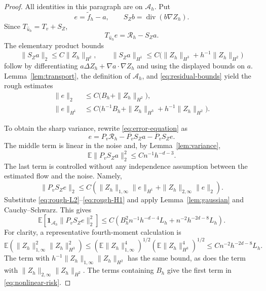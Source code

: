 \documentclass[11pt]{article}
\theoremstyle{remark}
\newcommand{\E}{\mathbb E}
\newcommand{\one}{\mathbf 1}
\DeclareMathOperator{\divergence}{div}
\begin{document}
\begin{proof}
All identities in this paragraph are on \(\mathcal A_h\).
Put
\[
e=\widetilde f_h-a,\qquad
S_Zb=\divergence(b\nabla Z_h).
\]
Since \(T_{\widehat u_h}=T_v+S_Z\),
\begin{equation}\label{eq:error-equation}
T_{\widehat u_h}e=\mathcal R_h-S_Za.
\end{equation}
The elementary product bounds
\[
\|S_Za\|_2\leq C\|Z_h\|_{H^2},
\qquad
\|S_Za\|_{H^1}
\leq C\big(\|Z_h\|_{H^3}+h^{-1}\|Z_h\|_{H^2}\big)
\]
follow by differentiating \(a\Delta Z_h+\nabla a\cdot\nabla Z_h\)
and using the displayed bounds on \(a\).
Lemma~\ref{lem:transport}, the definition of \(\mathcal A_h\),
and \eqref{eq:residual-bounds} yield the rough estimates
\begin{align}
\|e\|_2
&\leq C\big(B_h+\|Z_h\|_{H^2}\big),
\label{eq:rough-L2}\\
\|e\|_{H^1}
&\leq C\big(
h^{-1}B_h+\|Z_h\|_{H^3}
+h^{-1}\|Z_h\|_{H^2}\big).
\label{eq:rough-H1}
\end{align}

To obtain the sharp variance, rewrite \eqref{eq:error-equation} as
\begin{equation}\label{eq:sharp-expansion}
e=P_v\mathcal R_h-P_vS_Za-P_vS_Ze.
\end{equation}
The middle term is linear in the noise and, by
Lemma~\ref{lem:variance},
\begin{equation}\label{eq:linear-risk}
\E\|P_vS_Za\|_2^2\leq Cn^{-1}h^{-d-3}.
\end{equation}
The last term is controlled without any independence assumption
between the estimated flow and the noise. Namely,
\[
\|P_vS_Ze\|_2
\leq C\left(
\|Z_h\|_{1,\infty}\|e\|_{H^1}
+\|Z_h\|_{2,\infty}\|e\|_2
\right).
\]
Substitute \eqref{eq:rough-L2}--\eqref{eq:rough-H1} and apply
Lemma~\ref{lem:gaussian} and Cauchy--Schwarz. This gives
\begin{equation}\label{eq:nonlinear-risk}
\E\left[\one_{\mathcal A_h}\|P_vS_Ze\|_2^2\right]
\leq C\left(
B_h^2n^{-1}h^{-d-4}L_h
+n^{-2}h^{-2d-8}L_h
\right).
\end{equation}
For clarity, a representative fourth-moment calculation is
\[
\E\left(
\|Z_h\|_{1,\infty}^2\|Z_h\|_{H^3}^2
\right)
\leq
\left(\E\|Z_h\|_{1,\infty}^4\right)^{1/2}
\left(\E\|Z_h\|_{H^3}^4\right)^{1/2}
\leq Cn^{-2}h^{-2d-8}L_h.
\]
The term with
\(h^{-1}\|Z_h\|_{1,\infty}\|Z_h\|_{H^2}\)
has the same bound, as does the term with
\(\|Z_h\|_{2,\infty}\|Z_h\|_{H^2}\).
The terms containing \(B_h\) give the first term in
\eqref{eq:nonlinear-risk}.


\end{proof}
\end{document}
